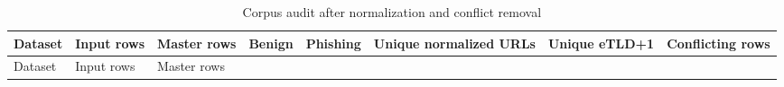 \documentclass[
  10pt,
]{article}
\begin{document}
\begin{longtable}[]{@{}
  >{\raggedright\arraybackslash}p{}
  >{\raggedleft\arraybackslash}p{}
  >{\raggedleft\arraybackslash}p{}
  >{\raggedleft\arraybackslash}p{}
  >{\raggedleft\arraybackslash}p{}
  >{\raggedleft\arraybackslash}p{}
  >{\raggedleft\arraybackslash}p{}
  >{\raggedleft\arraybackslash}p{}@{}}
\caption{Corpus audit after normalization and conflict
removal}\tabularnewline
\toprule\noalign{}
\begin{minipage}[b]{\linewidth}\raggedright
Dataset
\end{minipage} & \begin{minipage}[b]{\linewidth}\raggedleft
Input rows
\end{minipage} & \begin{minipage}[b]{\linewidth}\raggedleft
Master rows
\end{minipage} & \begin{minipage}[b]{\linewidth}\raggedleft
Benign
\end{minipage} & \begin{minipage}[b]{\linewidth}\raggedleft
Phishing
\end{minipage} & \begin{minipage}[b]{\linewidth}\raggedleft
Unique normalized URLs
\end{minipage} & \begin{minipage}[b]{\linewidth}\raggedleft
Unique eTLD+1
\end{minipage} & \begin{minipage}[b]{\linewidth}\raggedleft
Conflicting rows
\end{minipage} \\
\midrule\noalign{}
\endfirsthead
\toprule\noalign{}
\begin{minipage}[b]{\linewidth}\raggedright
Dataset
\end{minipage} & \begin{minipage}[b]{\linewidth}\raggedleft
Input rows
\end{minipage} & \begin{minipage}[b]{\linewidth}\raggedleft
Master rows
\end{minipage} & \begin{minipage}[b]{\linewidth}\raggedleft

\end{minipage}
\end{longtable}
\end{document}

